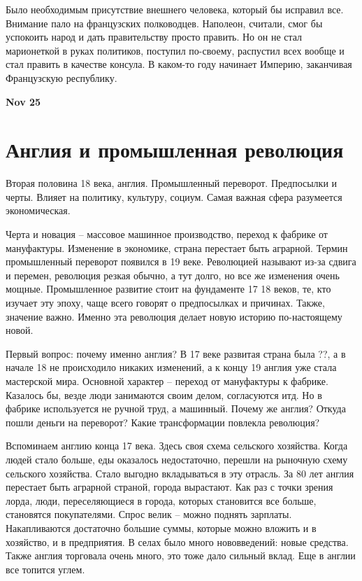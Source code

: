 \documentclass[a4paper, 12pt]{article}
\def\dateis#1{\vspace{\baselineskip}\hfill\textbf{#1}\par}
\begin{document}
\begin{multicols}{2}
Было необходимым присутствие внешнего человека, который бы исправил все. Внимание пало на французских полководцев. Наполеон, считали, смог бы успокоить народ и дать правительству просто править. Но он не стал марионеткой в руках политиков, поступил по-своему, распустил всех вообще и стал править в качестве консула. В каком-то году начинает Империю, заканчивая Французскую республику. 


\dateis{Nov 25}

\section{Англия и промышленная революция}

Вторая половина 18 века, англия. Промышленный переворот. Предпосылки и черты. Влияет на политику, культуру, социум. Самая важная сфера разумеется экономическая. 

Черта и новация -- массовое машинное производство, переход к фабрике от мануфактуры. Изменение в экономике, страна перестает быть аграрной. Термин промышленный переворот появился в 19 веке. Революцией называют из-за сдвига и перемен, революция резкая обычно, а тут долго, но все же изменения очень мощные. Промышленное развитие стоит на фундаменте 17 18 веков, те, кто изучает эту эпоху, чаще всего говорят о предпосылках и причинах. Также, значение важно. Именно эта революция делает новую историю по-настоящему новой. 

Первый вопрос: почему именно англия? В 17 веке развитая страна была ??, а в начале 18 не происходило никаких изменений, а к концу 19 англия уже стала мастерской мира. Основной характер -- переход от мануфактуры к фабрике. Казалось бы, везде люди занимаются своим делом, согласуются итд. Но в фабрике используется не ручной труд, а машинный. Почему же англия? Откуда пошли деньги на переворот? Какие трансформации повлекла революция?

Вспоминаем англию конца 17 века. Здесь своя схема сельского хозяйства. Когда людей стало больше, еды оказалось недостаточно, перешли на рыночную схему сельского хозяйства. Стало выгодно вкладываться в эту отрасль. За 80 лет англия перестает быть аграрной страной, города вырастают. Как раз с точки зрения лорда, люди, переселяющиеся в города, которых становится все больше, становятся покупателями. Спрос велик -- можно поднять зарплаты. Накапливаются достаточно большие суммы, которые можно вложить и в хозяйство, и в предприятия. В селах было много нововведений: новые средства. Также англия торговала очень много, это тоже дало сильный вклад. Еще в англии все топится углем. 


\end{multicols}
\end{document}
